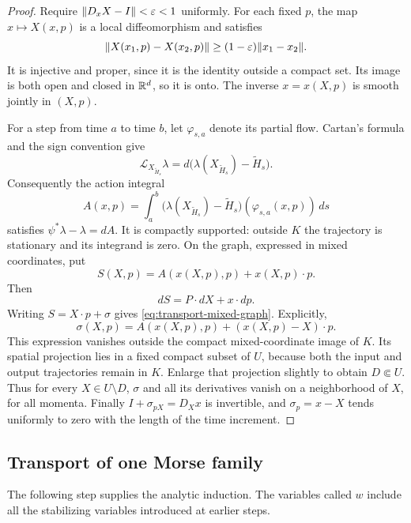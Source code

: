 \begin{proof}
Require $\lVert D_xX-I\rVert<\varepsilon<1$ uniformly.  For each fixed $p$,
the map $x\mapsto X(x,p)$ is a local diffeomorphism and satisfies
\[
 \lVert X(x_1,p)-X(x_2,p)\rVert\ge(1-\varepsilon)\lVert x_1-x_2\rVert.
\]
It is injective and proper, since it is the identity outside a compact
set.  Its image is both open and closed in $\mathbb R^d$, so it is onto.
The inverse $x=x(X,p)$ is smooth jointly in $(X,p)$.

For a step from time $a$ to time $b$, let $\varphi_{s,a}$ denote
its partial flow.  Cartan's formula and the sign convention give
\[
 \mathcal L_{X_{\widetilde H_s}}\lambda
   =d\bigl(\lambda(X_{\widetilde H_s})-\widetilde H_s\bigr).
\]
Consequently the action integral
\begin{equation}
 A(x,p)=\int_a^b
  \bigl(\lambda(X_{\widetilde H_s})-\widetilde H_s\bigr)
          (\varphi_{s,a}(x,p))\,ds
 \label{eq:transport-action}
\end{equation}
satisfies $\psi^*\lambda-\lambda=dA$.  It is compactly supported:
outside $K$ the trajectory is stationary and its integrand is zero.
On the graph, expressed in mixed coordinates, put
\[
 S(X,p)=A(x(X,p),p)+x(X,p)\cdot p.
\]
Then
\[
 dS=P\cdot dX+x\cdot dp.
\]
Writing $S=X\cdot p+\sigma$ gives
\eqref{eq:transport-mixed-graph}.  Explicitly,
\begin{equation}
 \sigma(X,p)=A(x(X,p),p)+(x(X,p)-X)\cdot p.
 \label{eq:transport-compact-sigma}
\end{equation}
This expression vanishes outside the compact mixed-coordinate image
of $K$.  Its spatial projection lies in a fixed compact subset of
$U$, because both the input and output trajectories remain in $K$.
Enlarge that projection slightly to obtain $D\Subset U$.  Thus for
every $X\in U\setminus D$, $\sigma$ and all its derivatives vanish
on a neighborhood of $X$, for all momenta.  Finally
$I+\sigma_{pX}=D_Xx$ is invertible, and
$\sigma_p=x-X$ tends uniformly to zero with the length of the time
increment.
\end{proof}

\subsection{Transport of one Morse family}

The following step supplies the analytic induction.  The variables
called $w$ include all the stabilizing variables introduced at earlier
steps.

